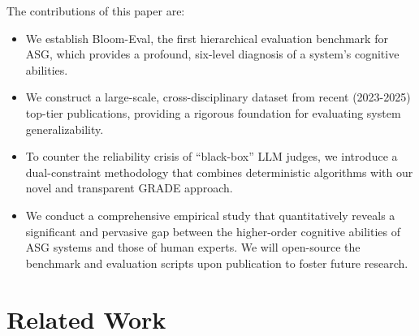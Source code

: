 \documentclass[11pt]{article}
\begin{document}
The contributions of this paper are:
\vspace{-2mm}
\begin{itemize}[itemsep=0pt, parsep=0pt]
    \item We establish Bloom-Eval, the first hierarchical evaluation benchmark for ASG, which provides a profound, six-level diagnosis of a system's cognitive abilities.
    
    \item We construct a large-scale, cross-disciplinary dataset from recent (2023-2025) top-tier publications, providing a rigorous foundation for evaluating system generalizability.
    
    \item To counter the reliability crisis of ``black-box'' LLM judges, we introduce a dual-constraint methodology that combines deterministic algorithms with our novel and transparent GRADE approach.

    \item We conduct a comprehensive empirical study that quantitatively reveals a significant and pervasive gap between the higher-order cognitive abilities of ASG systems and those of human experts. We will open-source the benchmark and evaluation scripts upon publication to foster future research.
\end{itemize}

\section{Related Work}
\label{sec:related_work}
\end{document}
